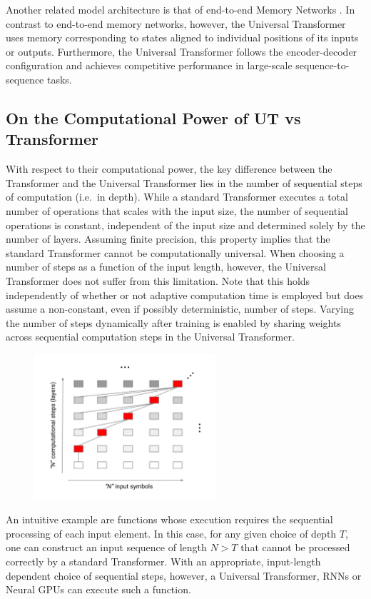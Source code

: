 Another related model architecture is that of end-to-end Memory Networks \citep{sukhbaatar2015}. In contrast to end-to-end memory networks, however, the Universal Transformer uses memory corresponding to states aligned to individual positions of its inputs or outputs. Furthermore, the Universal Transformer follows the encoder-decoder configuration and achieves competitive performance in large-scale sequence-to-sequence tasks.


\subsection{On the Computational Power of UT vs Transformer}
\label{app:univerrality_example}

With respect to their computational power, the key difference between the Transformer and the Universal Transformer lies in the number of sequential steps of computation (i.e.\ in depth). While a standard Transformer executes a total number of operations that scales with the input size, the number of sequential operations is constant, independent of the input size and determined solely by the number of layers. Assuming finite precision, this property implies that the standard Transformer cannot be computationally universal. When choosing a number of steps as a function of the input length, however, the Universal Transformer does not suffer from this limitation. Note that this holds independently of whether or not adaptive computation time is employed but does assume a non-constant, even if possibly deterministic, number of steps. Varying the number of steps dynamically after training is enabled by sharing weights across sequential computation steps in the Universal Transformer.

\begin{figure}[t]
\centering
\includegraphics[width=0.6\textwidth, trim={0.1cm 0.5cm 0.1cm 1.2cm}, clip]{04-part-03/chapter-06/figs_and_tables/fig_universality_example.png}
\end{figure}

An intuitive example are functions whose execution requires the sequential processing of each input element. In this case, for any given choice of depth $T$, one can construct an input sequence of length $N>T$ that cannot be processed correctly by a standard Transformer. With an appropriate, input-length dependent choice of sequential steps, however, a Universal Transformer, RNNs or Neural GPUs can execute such a function.